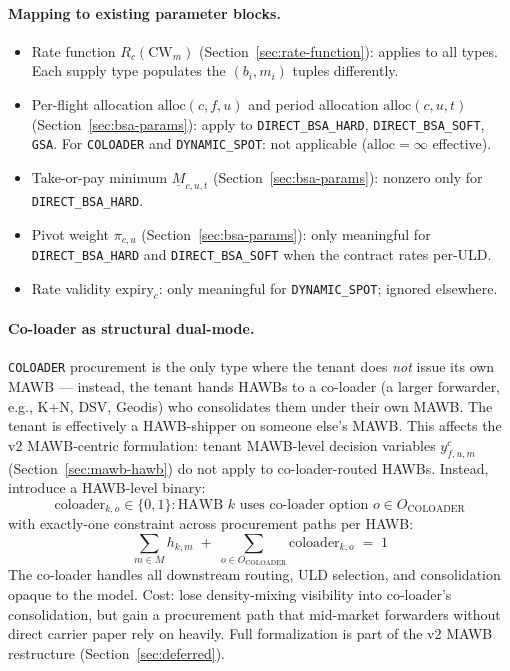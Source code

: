 \documentclass[11pt,a4paper]{article}
\theoremstyle{definition}
\begin{document}
\paragraph{Mapping to existing parameter blocks.}
\begin{itemize}[noitemsep]
  \item Rate function \(R_c(\text{CW}_m)\) (Section~\ref{sec:rate-function}):
        applies to all types. Each supply type populates the
        \((b_i, m_i)\) tuples differently.
  \item Per-flight allocation \(\text{alloc}(c, f, u)\) and period allocation
        \(\text{alloc}(c, u, t)\) (Section~\ref{sec:bsa-params}): apply to
        \texttt{DIRECT\_BSA\_HARD}, \texttt{DIRECT\_BSA\_SOFT}, \texttt{GSA}.
        For \texttt{COLOADER} and \texttt{DYNAMIC\_SPOT}: not applicable
        (\(\text{alloc} = \infty\) effective).
  \item Take-or-pay minimum \(\underline{M}_{c,u,t}\) (Section~\ref{sec:bsa-params}):
        nonzero only for \texttt{DIRECT\_BSA\_HARD}.
  \item Pivot weight \(\pi_{c,u}\) (Section~\ref{sec:bsa-params}): only meaningful for
        \texttt{DIRECT\_BSA\_HARD} and \texttt{DIRECT\_BSA\_SOFT} when the contract
        rates per-ULD.
  \item Rate validity \(\text{expiry}_c\): only meaningful for
        \texttt{DYNAMIC\_SPOT}; ignored elsewhere.
\end{itemize}

\paragraph{Co-loader as structural dual-mode.}
\texttt{COLOADER} procurement is the only type where the tenant does \emph{not}
issue its own MAWB — instead, the tenant hands HAWBs to a co-loader (a larger
forwarder, e.g., K+N, DSV, Geodis) who consolidates them under their own MAWB.
The tenant is effectively a HAWB-shipper on someone else's MAWB. This affects
the v2 MAWB-centric formulation: tenant MAWB-level decision variables
\(y_{f,u,m}^c\) (Section~\ref{sec:mawb-hawb}) do not apply to co-loader-routed
HAWBs. Instead, introduce a HAWB-level binary:
\begin{equation}
  \text{coloader}_{k, o} \in \{0, 1\}: \text{HAWB } k \text{ uses co-loader option } o \in O_{\text{COLOADER}}
  \label{eq:coloader}
\end{equation}
with exactly-one constraint across procurement paths per HAWB:
\begin{equation*}
  \sum_{m \in M} h_{k, m} \;+\; \sum_{o \in O_{\text{COLOADER}}} \text{coloader}_{k, o} \;=\; 1
\end{equation*}
The co-loader handles all downstream routing, ULD selection, and consolidation
opaque to the model. Cost: lose density-mixing visibility into co-loader's
consolidation, but gain a procurement path that mid-market forwarders without
direct carrier paper rely on heavily. Full formalization is part of the v2 MAWB
restructure (Section~\ref{sec:deferred}).
\end{document}
